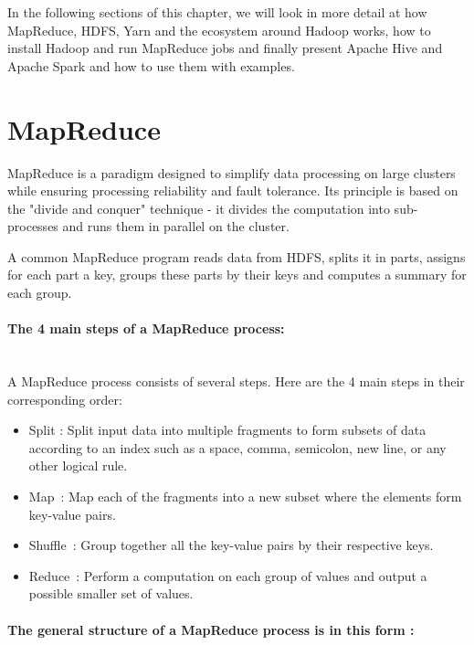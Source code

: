 \documentclass[12pt,english]{book}
\begin{document}
In the following sections of this chapter, we will look in more detail at how MapReduce, HDFS, Yarn and the ecosystem around Hadoop works, how to install Hadoop and run MapReduce jobs and finally present Apache Hive and Apache Spark and how to use them with examples.


\section{MapReduce}


MapReduce is a paradigm designed to simplify data processing on large clusters while ensuring processing reliability and fault tolerance.
Its principle is based on the "divide and conquer" technique - it divides the computation into sub-processes and runs them in parallel on the cluster.

A common MapReduce program reads data from HDFS, splits it in parts, assigns for each part a key, groups these parts by their keys and computes a summary for each group.


\paragraph{The 4 main steps of a MapReduce process:}\mbox{}\\


A MapReduce process consists of several steps. Here are the 4 main steps in their corresponding order:
 
\begin{itemize}
\item
Split : Split input data into multiple fragments to form subsets of data according to an index such as a space, comma, semicolon, new line, or any other logical rule.
\item
Map : Map each of the fragments into a new subset where the elements form key-value pairs.
\item
Shuffle : Group together all the key-value pairs by their respective keys.
\item
Reduce : Perform a computation on each group of values and output a possible smaller set of values.
\end{itemize}


\paragraph{The general structure of a MapReduce process is in this form :}\mbox{}\\
\end{document}
